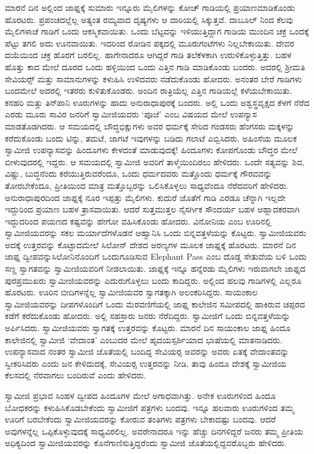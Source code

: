  ಮಾರನೆ ದಿನ ಅಲ್ಲಿಂದ ಜಾಫ್ನಕ್ಕೆ ಸುಮಾರು ಇನ್ನೂರು ಮೈಲಿಗಳನ್ನು ಕೋಚ್ ಗಾಡಿಯಲ್ಲಿ ಪ್ರಯಾಣಮಾಡಿಕೊಂಡು ಹೊರಟರು. ಪ್ರಪಂಚದಲ್ಲೆಲ್ಲ ಅತ್ಯಂತ ರಮ್ಯವಾದ ದೃಷ್ಯಗಳು ಆ ದಾರಿಯಲ್ಲಿ ಸಿಕ್ಕುತ್ತವೆ. ದಾಬೂಲ್ ನಿಂದ ಕೆಲವು ಮೈಲಿಗಳಾಚೆ ಗಾಡಿಗೆ ಒಂದು ಆಕಸ್ಮಿಕವಾಯಿತು. ಒಂದು ಬೆಟ್ಟವನ್ನು ಇಳಿಯುತ್ತಿದ್ದಾಗ ಗಾಡಿಯ ಮುಂದಿನ ಚಕ್ರ ಒಂದಕ್ಕೆ ಪೆಟ್ಟು ತಗಲಿ ಅದು ಊನವಾಯಿತು. ಇದರಿಂದ ರೋಡಿನ ಪಕ್ಕದಲ್ಲಿ ಮೂರುಗಂಟೆಗಳು ನಿಲ್ಲಬೇಕಾಯಿತು. ದೇವರ ದಯೆಯಿಂದ ಚಕ್ರ ಹೊರಗೆ ಬರಲಿಲ್ಲ. ಹಾಗೇನಾದರೂ ಆಗಿದ್ದರೆ ಗಾಡಿ ತಲೆಕೆಳಕಾಗಿ ಉರುಳಿಕೊಳ್ಳುತ್ತಿತ್ತು. ಬಹಳ ಹೊತ್ತು ಕಾದ ಮೇಲೆ ದೂರದ ಒಂದು ಹಳ್ಳಿಯಿಂದ ಒಂದು ಎತ್ತಿನ ಗಾಡಿ ಮಾಡಿಕೊಂಡು ಬಂದರು. ಅದರಲ್ಲಿ ಶ‍್ರೀಮತಿ ಸೇವಿಯರ್ಸ್‍‍ ಮತ್ತು ಸಾಮಾನುಗಳನ್ನು ಕಳುಹಿಸಿ ಉಳಿದವರು ನಡೆದುಕೊಂಡು ಹೋದರು. ಅನಂತರ ಬೇರೆ ಗಾಡಿಗಳು ಬಂದಮೇಲೆ ಅದರಲ್ಲಿ ಇತರರು ಕುಳಿತುಕೊಂಡರು. ಅಂದಿನ ರಾತ್ರಿಯೆಲ್ಲ ಎತ್ತಿನ ಗಾಡಿಯಲ್ಲೆ ಕಳೆಯಬೇಕಾಯಿತು. ಕನಹರಿ ಮತ್ತು ತಿನ್‍ಪಾನಿ ಊರುಗಳನ್ನು ಹಾದು ಅನುರಾಧಾಪುರಕ್ಕೆ ಬಂದರು. ಅಲ್ಲಿ ಒಂದು ಅಶ್ವಸ್ಥವೃಕ್ಷದ ಕೆಳಗೆ ನೆರೆದ ಎರಡು ಮೂರು ಸಾವಿರ ಜನರಿಗೆ ಸ್ವಾಮೀಜಿಯವರು ‘ಪೂಜೆ’ ಎಂಬ ವಿಷಯದ ಮೇಲೆ ಉಪನ್ಯಾಸ ಮಾಡತೊಡಗಿದರು. ಆ ಸಮಯದಲ್ಲಿ ಬೌದ್ಧಭಿಕ್ಷುಗಳು ಅವರ ಧರ್ಮಕ್ಕೆ ಸೇರಿದ ಗಂಡಸರು ಹೆಂಗಸರು ಮಕ್ಕಳನ್ನು ಕರೆದುಕೊಂಡು ಬಂದು ಟಿನ್ನು, ತಮಟೆ, ಜಾಗಟೆ ಇವುಗಳನ್ನು ಬಡಿದು ಗಲಾಟೆ ಎಬ್ಬಿಸಿದರು, ಅಹಿಂಸೆಯ ಮೂಲಕ ಸ್ವಾಮೀಜಿ ಉಪನ್ಯಾಸವನ್ನು ಹಿಂದೂಗಳು ಕೇಳದಂತೆ ಮಾಡುವುದಕ್ಕೆ‌! ಹಿಂದೂಗಳು ಕೋಪಗೊಂಡು ಬೌದ್ಧರ ಮೇಲೆ ಬೀಳುವುದರಲ್ಲಿ ಇದ್ದರು. ಆ ಸಮಯದಲ್ಲಿ ಸ್ವಾಮೀಜಿ ಅವರಿಗೆ ತಾಳ್ಮೆಯಿಂದಿರಲು ಹೇಳಿದರು. ಒಂದೇ ಸತ್ಯವನ್ನು ಶಿವ, ವಿಷ್ಣು, ಬುದ್ಧನೆಂದು ಕರೆಯುತ್ತಿರುವರೆಂದೂ, ಒಂದು ಧರ್ಮದವರು ಮತ್ತೊಂದು ಧರ್ಮಕ್ಕೆ ಗೌರವವನ್ನು ತೋರಬೇಕೆಂದೂ, ಪ್ರೀತಿಯಿಂದ ಮಾತ್ರ ಮತ್ತೊಬ್ಬರನ್ನು ಒಲಿಸಿಕೊಳ್ಳಲು ಸಾಧ್ಯವೆಂದೂ ನೆರೆದವರಿಗೆ ಹೇಳಿದರು. ಅನುರಾಧಾಪುರದಿಂದ ಜಾಫ್ನಕ್ಕೆ ನೂರ ಇಪ್ಪತ್ತು ಮೈಲಿಗಳು. ಕುದುರೆ ಜೊತೆಗೆ ಗಾಡಿ ಎರಡೂ ಚೆನ್ನಾಗಿ ಇಲ್ಲದೇ ಇದ್ದುರಿಂದ ಪ್ರಯಾಣ ಬಹಳ ತ್ರಾಸವಾಯಿತು. ಆದರೆ ಸುತ್ತಮುತ್ತಲ ನೈಸರ್ಗಿಕ ಸೌಂದರ್ಯ ಬಹಳ ಆಹ್ಲಾದಕರವಾಗಿ ಇದ್ದುದರಿಂದ ಪಯಣದ ಕಷ್ಟವನ್ನು ಹೇಗೋ ವಹಿಸಿಕೊಂಡು ಹೋದರು. ವಿನೋನಿಯ ಎಂಬ ಊರಿನಲ್ಲಿ ಸ್ವಾಮೀಜಿಯವರನ್ನು ಸಕಲ ಮರ್ಯಾದೆಗಳೊಡನೆ ಆಹ್ವಾನಿಸಿ ಒಂದು ಬಿನ್ನವತ್ತಳೆಯನ್ನು ಕೊಟ್ಟರು. ಸ್ವಾಮೀಜಿಯವರು ಅದಕ್ಕೆ ಉತ್ತರವನ್ನು ಕೊಟ್ಟಾದಮೇಲೆ ಸಿಲೋನ್ ದೇಶದ ಅರಣ್ಯಗಳ ಮೂಲಕ ಜಾಫ್ನಕ್ಕೆ ಹೊರಟರು. ಮಾರನೆ ದಿನ ಜಾಫ್ನ ದ್ವೀಪವನ್ನು\break ಸಿಲೋನಿನೊಂದಿಗೆ ಒಂದುಗೂಡಿಸುವ Elephant Pass ಎಂಬ ದೊಡ್ಡ ಸೇತುವೆಯ ಬಳಿ ಒಂದು ಸಣ್ಣ ಸ್ವಾಗತವನ್ನು ಸ್ವಾಮೀಜಿಯವರಿಗೆ ನೀಡಲಾಯಿತು. ಜಾಫ್ನಕ್ಕೆ ಇನ್ನೂ ಹನ್ನೆರಡು ಮೈಲಿಗಳು ಇರುವಾಗಲೇ ಜಾಫ್ನದ ಪುರಪ್ರಮುಖರು ಸ್ವಾಮೀಜಿಯವರನ್ನು ಎದುರುಗೊಳ್ಳಲು ಬಂದು ಕಾದಿದ್ದರು. ಅಲ್ಲಿಂದ ಹಲವು ಗಾಡಿಗಳಲ್ಲಿ ಎಲ್ಲರೂ ಹೊರಟರು. ಊರಿನ ಬೀದಿಗಳನ್ನೆಲ್ಲ ಸ್ವಾಮೀಜಿಯವರ ಸ್ವಾಗತಕ್ಕಾಗಿ ಅಲಂಕರಿಸಿದ್ದರು. ಸಾಯಂಕಾಲ ಸ್ವಾಮೀಜಿಯವರನ್ನು ದೀಪಗಳೊಂದಿಗೆ ಒಂದು ಮೆರವಣಿಗೆಯಲ್ಲಿ ಜಾಫ್ನ ಕಾಲೇಜಿನ ಸಮೀಪದಲ್ಲಿ ಹಾಕಿರುವ ಚಪ್ಪರದ ಕಡೆಗೆ ಕರೆದುಕೊಂಡು ಹೋದರು. ಅಲ್ಲಿ ಸಹಸ್ರಾರು ಜನರು ನೆರೆದಿದ್ದರು. ಸ್ವಾಮೀಜಿಗೆ ಒಂದು ಬಿನ್ನವತ್ತಳೆಯನ್ನು ಅರ್ಪಿಸಿದರು. ಸ್ವಾಮೀಜಿಯವರು ಸ್ವಾಗತಕ್ಕೆ ಉತ್ತರವನ್ನು ಕೊಟ್ಟರು. ಮಾರನೆ ದಿನ ಸಾಯಂಕಾಲ ಜಾಫ್ನ ಹಿಂದೂ ಕಾಲೇಜಿನಲ್ಲಿ ಸ್ವಾಮೀಜಿ ‘ವೇದಾಂತ’ ಎಂಬುದರ ಮೇಲೆ ಹೃದಯಸ್ಪರ್ಶಿಯಾದ ಭಾಷೆಯಲ್ಲಿ ಮಾತನಾಡಿದರು. ಉಪನ್ಯಾಸವಾದ ನಂತರ ಸ್ವಾಮೀಜಿ ಜೊತೆಯಲ್ಲಿ ಬಂದಿದ್ದ ಸೇವಿಯರ‍್ಸ ಅವರನ್ನು ಅವರು ಏತಕ್ಕೆ ವೇದಾಂತವನ್ನು ಸ್ವೀಕರಿಸಿದರು ಎಂದು ಜನ ಕೇಳಿದುದಕ್ಕೆ, ಸೇವಿಯರ‍್ಸ ಉತ್ತರವನ್ನು ನೀಡಿ, ತಾವು ಹಿಂದೂ ದೇಶಕ್ಕೆ ಸ್ವಾಮೀಜಿಯ ಕೆಲಸದಲ್ಲಿ ನೆರವಾಗಲು ಬಂದಿರುವೆ ಎಂದು ಹೇಳಿದರು. 

 ಸ್ವಾಮೀಜಿ ಪ್ರಭಾವ ಸಿಂಹಳ ದ್ವೀಪದ ಹಿಂದೂಗಳ ಮೇಲೆ ಅಗಾಧವಾಗಿತ್ತು. ಅನೇಕ ಊರುಗಳಿಂದ ಹಿಂದೂ ಬೋಧಕರನ್ನು ಕಳುಹಿಸಿಕೊಡಬೇಕೆಂದು ಸ್ವಾಮೀಜಿಗೆ ಪತ್ರಗಳು ಬಂದವು. ಇನ್ನೂ ಹಲವಾರು ಊರುಗಳಿಂದ ತಮ್ಮ ಊರಿಗೆ ಬರಬೇಕೆಂದು ಸ್ವಾಮೀಜಿಯವರನ್ನು ಕೋರುವ ತಂತಿಗಳು ಪತ್ರಗಳು ಬೇಕಾದಷ್ಟು ಬಂದವು. ಆದರೆ ಅವುಗಳನ್ನೆಲ್ಲ ಒಪ್ಪಿಕೊಳ್ಳುವುದಕ್ಕೆ ಸಾಧ್ಯವಿರಲಿಲ್ಲ. ಅವರೇನಾದರೂ ಇನ್ನು ಹೆಚ್ಚು ದಿನಗಳಿದ್ದರೆ ಜನರು ತಮ್ಮ ಪ್ರೀತಿಯ ಅಧಿಕ್ಯದಿಂದ ಸ್ವಾಮೀಜಿಯವರನ್ನು ಕೊನೆಗಾಣಿಸುತ್ತಿದ್ದರೆಂದು ಸ್ವಾಮೀಜಿ ಜೊತೆಯಲ್ಲಿದ್ದವರೊಬ್ಬರು ಹೇಳಿದರು. 

